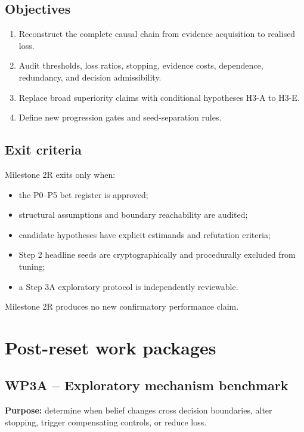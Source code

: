 \documentclass[11pt,a4paper]{report}
\begin{document}
\section{Objectives}

\begin{enumerate}
  \item Reconstruct the complete causal chain from evidence acquisition to realised loss.
  \item Audit thresholds, loss ratios, stopping, evidence costs, dependence, redundancy, and decision admissibility.
  \item Replace broad superiority claims with conditional hypotheses H3-A to H3-E.
  \item Define new progression gates and seed-separation rules.
\end{enumerate}

\section{Exit criteria}

Milestone 2R exits only when:
\begin{itemize}
  \item the P0--P5 bet register is approved;
  \item structural assumptions and boundary reachability are audited;
  \item candidate hypotheses have explicit estimands and refutation criteria;
  \item Step 2 headline seeds are cryptographically and procedurally excluded from tuning;
  \item a Step 3A exploratory protocol is independently reviewable.
\end{itemize}

Milestone 2R produces no new confirmatory performance claim.

\chapter{Post-reset work packages}

\section{WP3A -- Exploratory mechanism benchmark}

\textbf{Purpose:} determine when belief changes cross decision boundaries, alter stopping, trigger compensating controls, or reduce loss.
\end{document}
